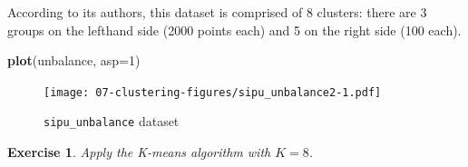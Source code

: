 \documentclass[10pt,b5paper,krantz1]{krantz}
\newenvironment{Shaded}{\begin{snugshade}}{\end{snugshade}}
\newcommand{\DataTypeTok}[1]{\textcolor[rgb]{0.27,0.27,0.27}{#1}}
\newcommand{\DecValTok}[1]{\textcolor[rgb]{0.06,0.06,0.06}{#1}}
\newcommand{\KeywordTok}[1]{\textcolor[rgb]{0.27,0.27,0.27}{\textbf{#1}}}
\newcommand{\NormalTok}[1]{#1}
\newtheorem{exercise}{Exercise}[chapter]
\begin{document}
According to its authors, this dataset is comprised of 8 clusters:
there are 3 groups on the lefthand side (2000 points each)
and 5 on the right side (100 each).

\begin{Shaded}
\begin{Highlighting}[]
\KeywordTok{plot}\NormalTok{(unbalance, }\DataTypeTok{asp=}\DecValTok{1}\NormalTok{)}
\end{Highlighting}
\end{Shaded}

\begin{figure}
\hypertarget{fig:sipu_unbalance2}{%
\centering
\texttt{[image: 07-clustering-figures/sipu\_unbalance2-1.pdf]}
\caption{\texttt{sipu\_unbalance} dataset}\label{fig:sipu_unbalance2}
}
\end{figure}

\begin{exercise}

Apply the K-means algorithm with \(K=8\).

\end{exercise}
\end{document}
